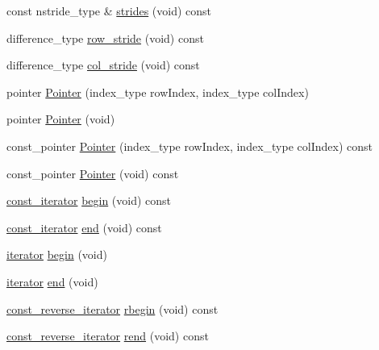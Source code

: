 \begin{DoxyCompactItemize}
\item 
const nstride\-\_\-type \& \hyperlink{classvct_dynamic_matrix_owner_a5d51db98e98175fadef6c0abbd6f7cbc}{strides} (void) const 
\item 
difference\-\_\-type \hyperlink{classvct_dynamic_matrix_owner_ab36acf0781fab37716ac2b9a9b597438}{row\-\_\-stride} (void) const 
\item 
difference\-\_\-type \hyperlink{classvct_dynamic_matrix_owner_a0b2b4b9cc113e9d566156dd397a8454e}{col\-\_\-stride} (void) const 
\item 
pointer \hyperlink{classvct_dynamic_matrix_owner_a3798759a1e6b1d5f478ffa2f204a52f6}{Pointer} (index\-\_\-type row\-Index, index\-\_\-type col\-Index)
\item 
pointer \hyperlink{classvct_dynamic_matrix_owner_a573e0c3cd3170ee877fe15bc7f2f01b0}{Pointer} (void)
\item 
const\-\_\-pointer \hyperlink{classvct_dynamic_matrix_owner_a214ebb77719384052a09bb98971fe360}{Pointer} (index\-\_\-type row\-Index, index\-\_\-type col\-Index) const 
\item 
const\-\_\-pointer \hyperlink{classvct_dynamic_matrix_owner_ad9c8a147bff9542751ae1caf287b8775}{Pointer} (void) const 
\item 
\hyperlink{classvct_dynamic_matrix_owner_ac83fab5858a222a2debcf2059c9f06e2}{const\-\_\-iterator} \hyperlink{classvct_dynamic_matrix_owner_a895a2692a9541c359af85c5c7a6f03c6}{begin} (void) const 
\item 
\hyperlink{classvct_dynamic_matrix_owner_ac83fab5858a222a2debcf2059c9f06e2}{const\-\_\-iterator} \hyperlink{classvct_dynamic_matrix_owner_a950149b64ccadd49c0eb30c237e79b4e}{end} (void) const 
\item 
\hyperlink{classvct_dynamic_matrix_owner_aa723836eb06a7ae230e80ec85a44e059}{iterator} \hyperlink{classvct_dynamic_matrix_owner_a2aabf6efb212452edbdfb406901d333d}{begin} (void)
\item 
\hyperlink{classvct_dynamic_matrix_owner_aa723836eb06a7ae230e80ec85a44e059}{iterator} \hyperlink{classvct_dynamic_matrix_owner_ad1cf9fe2bdd77bcd3608302d69b1a415}{end} (void)
\item 
\hyperlink{classvct_dynamic_matrix_owner_a3f5a649a5285f9909e4628151d9cdac1}{const\-\_\-reverse\-\_\-iterator} \hyperlink{classvct_dynamic_matrix_owner_a03a22a79b7df7aba41e15490dde8202f}{rbegin} (void) const 
\item 
\hyperlink{classvct_dynamic_matrix_owner_a3f5a649a5285f9909e4628151d9cdac1}{const\-\_\-reverse\-\_\-iterator} \hyperlink{classvct_dynamic_matrix_owner_a8b1e8e411a8ab85eebfe4b1b0a1df797}{rend} (void) const 

\end{DoxyCompactItemize}
